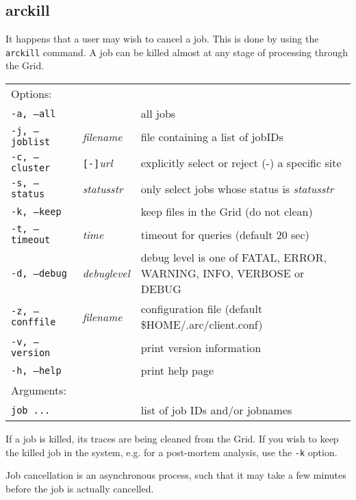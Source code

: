 \subsection{arckill}
\label{sec:arckill}

It happens that a user may wish to cancel a job. This is done by using
the \texttt{arckill}  command. A
job can be killed almost at any stage of processing through the Grid.

\hspace*{0.5cm}
\begin{shaded}
\end{shaded}
\begin{longtable}{llp{8cm}}
   Options:&&\\
   \texttt{-a, --all}& & all jobs\\
   \texttt{-j, --joblist}& \textit{filename} & file containing a list of jobIDs\\
   \texttt{-c, --cluster}&\verb#[-]#\textit{url}&explicitly select or reject (-) a specific site\\
   \texttt{-s, --status}& \textit{statusstr} &only select jobs whose status is \textit{statusstr}\\
   \texttt{-k, --keep}& & keep files in the Grid (do not clean)\\
   \texttt{-t, --timeout}& \textit{time} & timeout for queries (default 20 sec)\\
   \texttt{-d, --debug}& \textit{debuglevel}&debug level is one of  FATAL, ERROR, WARNING, INFO, VERBOSE or DEBUG\\
   \texttt{-z, --conffile}&\textit{filename}& configuration file (default {\$}HOME/.arc/client.conf)\\
   \texttt{-v, --version}& & print version information\\
   \texttt{-h, --help}& & print help page\\
   Arguments:&&\\
   \texttt{job ...} && list of job IDs and/or jobnames\\
\end{longtable}

If a job is killed, its traces are being cleaned from the Grid. If you wish to keep the killed job
in the system, e.g. for a post-mortem analysis, use the \verb#-k# option.

\begin{framed}
   Job cancellation is an asynchronous process, such that it
   may take a few minutes before the job is actually cancelled.
\end{framed}

